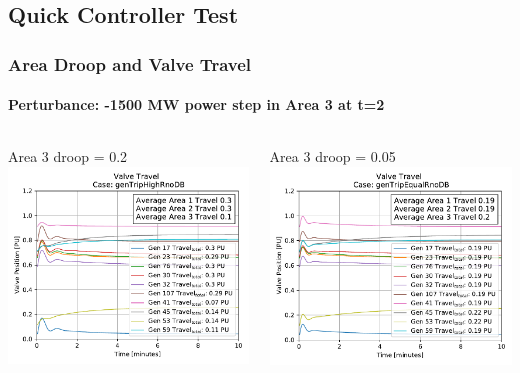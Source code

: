 \documentclass[14pt, unknownkeysallowed]{beamer}
\begin{document}
\subsection{Quick Controller Test}
\begin{frame}
\frametitle{Area Droop and Valve Travel}
\framesubtitle{Perturbance: -1500 MW power step in Area 3 at t=2}
\begin{columns}
\begin{column}{.5\linewidth}
{\tiny Area 3 droop = 0.2}
	\includegraphics[width=\linewidth]{genTripHighRnoDBValveTravel01}
\end{column}
\begin{column}{.5\linewidth}
{\tiny Area 3 droop = 0.05}
	\includegraphics[width=\linewidth]{genTripEqualRnoDBValveTravel01}
\end{column}
\end{columns}
\end{frame}
\end{document}
